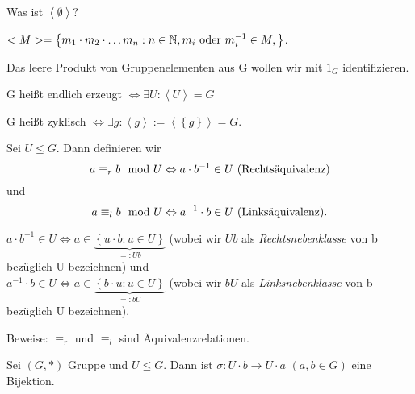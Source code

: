 \documentclass[10pt]{scrbook}
\begin{document}
\begin{Auf}Was ist $\left\langle \emptyset \right\rangle$?\end{Auf}

\begin{Le}$<M>=\left\{m_1\cdot m_2\cdot\ldots m_n: n\in\mathbb{N}, m_i \textnormal{ oder } m_i^{-1}\in M, \right\}$.\end{Le}

\begin{Bem}Das leere Produkt von Gruppenelementen aus G wollen wir mit $1_G$ identifizieren.\end{Bem}

\begin{Def}G heißt endlich erzeugt $\Leftrightarrow \exists U: \left\langle U\right\rangle=G$\end{Def}

\begin{Def}G heißt zyklisch $\Leftrightarrow \exists g: \left\langle g\right\rangle:=\left\langle\left\{g\right\}\right\rangle=G$.\end{Def}

\begin{Def}Sei $U\leq G$. Dann definieren wir
\begin{displaymath}
a\equiv_r b \mod U \Leftrightarrow a\cdot b^{-1}\in U\textnormal{ (Rechtsäquivalenz)}
\end{displaymath}
und
\begin{displaymath}
a\equiv_l b \mod U \Leftrightarrow a^{-1}\cdot b\in U\textnormal{ (Linksäquivalenz).}
\end{displaymath}
\end{Def}

\begin{Bem}
$a\cdot b^{-1}\in U \Leftrightarrow a\in \underbrace{\left\{u\cdot b: u\in U\right\}}_{=:U b}$ (wobei wir $U b$ als \emph{Rechtsnebenklasse} von b bezüglich U bezeichnen) und \\
$a^{-1}\cdot b\in U \Leftrightarrow a\in \underbrace{\left\{b\cdot u: u\in U\right\}}_{=:b U}$ (wobei wir $b U$ als \emph{Linksnebenklasse} von b bezüglich U bezeichnen).
\end{Bem}

\begin{Auf}
Beweise: $\equiv_r$ und $\equiv_l$ sind Äquivalenzrelationen.
\end{Auf}

\begin{Le}
Sei $(G, *)$ Gruppe und $U\leq G$. Dann ist $\sigma: U \cdot b \rightarrow U \cdot a$ $(a, b\in G)$ eine Bijektion.
\label{le:nebenklassen_bijektion}
\end{Le}
\end{document}
